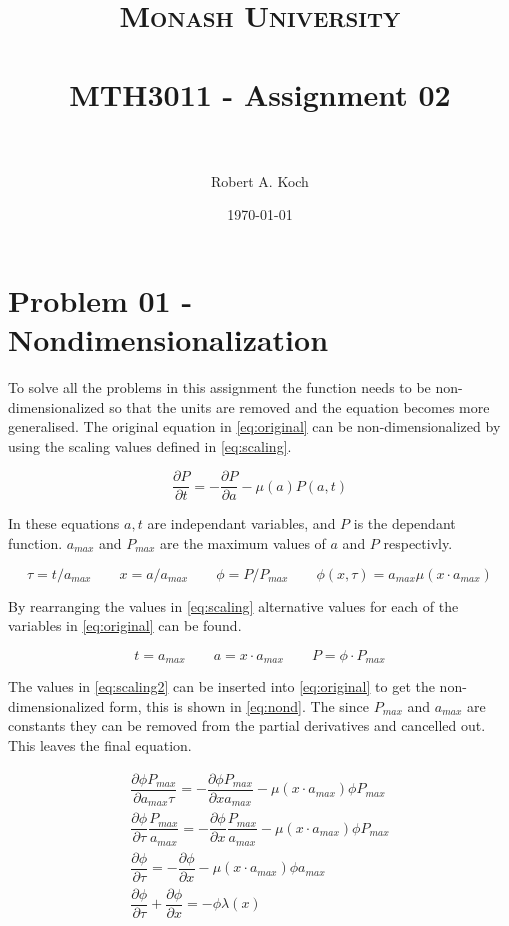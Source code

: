 \documentclass[paper=a4, fontsize=11pt]{scrartcl} %
\title{	
\normalfont \normalsize 
\textsc{Monash University} \\ [25pt] %
\horrule{0.5pt} \\[0.4cm] %
\huge MTH3011 - Assignment 02 \\ %
\horrule{2pt} \\[0.5cm] %
}
\author{Robert A. Koch} %
\date{\normalsize\today} %
\numberwithin{equation}{section} %
\numberwithin{figure}{section} %
\numberwithin{table}{section} %
\begin{document}
\maketitle %
\pagebreak


\section*{Problem 01 - Nondimensionalization}

To solve all the problems in this assignment the function needs to be non-dimensionalized so that the units are removed and the equation becomes more generalised. The original equation in \ref{eq:original} can be non-dimensionalized by using the scaling values defined in \ref{eq:scaling}.

\begin{equation} \label{eq:original}
	\dfrac{\partial P}{\partial t} = -\dfrac{\partial P}{\partial a} - \mu(a)P(a,t)
\end{equation}

In these equations $a,t$ are independant variables, and $P$ is the dependant function. $a_{max}$ and $P_{max}$ are the maximum values of $a$ and $P$ respectivly. 

\begin{equation} \label{eq:scaling}
	\tau = t/a_{max} 
	\qquad 
	x = a/a_{max}
	\qquad
	\phi=P/P_{max}
	\qquad
	\phi(x,\tau) = a_{max}\mu(x\cdot a_{max})
\end{equation}

By rearranging the values in \ref{eq:scaling} alternative values for each of the variables in \ref{eq:original} can be found. 

\begin{equation} \label{eq:scaling2}
	t = a_{max} 
	\qquad 
	a = x\cdot a_{max}
	\qquad
	P=\phi\cdot P_{max}
\end{equation}

The values in \ref{eq:scaling2} can be inserted into \ref{eq:original} to get the non-dimensionalized form, this is shown in \ref{eq:nond}. The since $P_{max}$ and $a_{max}$ are constants they can be removed from the partial derivatives and cancelled out. This leaves the final equation.

\begin{align} 
	\label{eq:nond}
	\dfrac{\partial \phi P_{max}}{\partial a_{max}\tau} = -\dfrac{\partial \phi P_{max}}{\partial x a_{max}} - \mu(x\cdot a_{max})\phi P_{max} \\
	\dfrac{\partial\phi}{\partial\tau}\dfrac{P_{max}}{a_{max}} = -\dfrac{\partial\phi}{\partial x}\dfrac{P_{max}}{a_{max}} - \mu(x\cdot a_{max})\phi P_{max} \\
	\dfrac{\partial\phi}{\partial\tau} = -\dfrac{\partial\phi}{\partial x}-\mu(x\cdot a_{max})\phi a_{max} \\
	\dfrac{\partial\phi}{\partial\tau} + \dfrac{\partial\phi}{\partial x}= -\phi\lambda(x)
\end{align}
\end{document}
